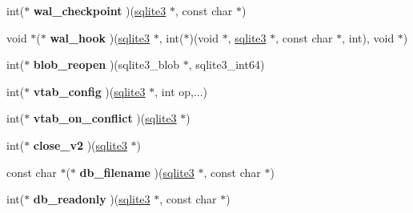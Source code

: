 \begin{DoxyCompactItemize}
\item 
int($\ast$ {\bfseries wal\+\_\+checkpoint} )(\hyperlink{structsqlite3}{sqlite3} $\ast$, const char $\ast$)\hypertarget{structsqlite3__api__routines_a8161479d3298a910a21e9d6dd92e1083}{}\label{structsqlite3__api__routines_a8161479d3298a910a21e9d6dd92e1083}

\item 
void $\ast$($\ast$ {\bfseries wal\+\_\+hook} )(\hyperlink{structsqlite3}{sqlite3} $\ast$, int($\ast$)(void $\ast$, \hyperlink{structsqlite3}{sqlite3} $\ast$, const char $\ast$, int), void $\ast$)\hypertarget{structsqlite3__api__routines_a967b53588e948815d36d870de8da8c60}{}\label{structsqlite3__api__routines_a967b53588e948815d36d870de8da8c60}

\item 
int($\ast$ {\bfseries blob\+\_\+reopen} )(sqlite3\+\_\+blob $\ast$, sqlite3\+\_\+int64)\hypertarget{structsqlite3__api__routines_aa908e25dd18c6a891a767eec620484e5}{}\label{structsqlite3__api__routines_aa908e25dd18c6a891a767eec620484e5}

\item 
int($\ast$ {\bfseries vtab\+\_\+config} )(\hyperlink{structsqlite3}{sqlite3} $\ast$, int op,...)\hypertarget{structsqlite3__api__routines_a9670fe7124c3bd00b32354933c15313f}{}\label{structsqlite3__api__routines_a9670fe7124c3bd00b32354933c15313f}

\item 
int($\ast$ {\bfseries vtab\+\_\+on\+\_\+conflict} )(\hyperlink{structsqlite3}{sqlite3} $\ast$)\hypertarget{structsqlite3__api__routines_ae153b85e12e894c0bfb433c13c2690d7}{}\label{structsqlite3__api__routines_ae153b85e12e894c0bfb433c13c2690d7}

\item 
int($\ast$ {\bfseries close\+\_\+v2} )(\hyperlink{structsqlite3}{sqlite3} $\ast$)\hypertarget{structsqlite3__api__routines_a432793b7437f57a622d9bae6172b345b}{}\label{structsqlite3__api__routines_a432793b7437f57a622d9bae6172b345b}

\item 
const char $\ast$($\ast$ {\bfseries db\+\_\+filename} )(\hyperlink{structsqlite3}{sqlite3} $\ast$, const char $\ast$)\hypertarget{structsqlite3__api__routines_a27e36530f88c1a4af56ec185d4d7ecb0}{}\label{structsqlite3__api__routines_a27e36530f88c1a4af56ec185d4d7ecb0}

\item 
int($\ast$ {\bfseries db\+\_\+readonly} )(\hyperlink{structsqlite3}{sqlite3} $\ast$, const char $\ast$)\hypertarget{structsqlite3__api__routines_ad1a3ff6e98715e9d0c9bdf6661dcbfc5}{}\label{structsqlite3__api__routines_ad1a3ff6e98715e9d0c9bdf6661dcbfc5}


\end{DoxyCompactItemize}
